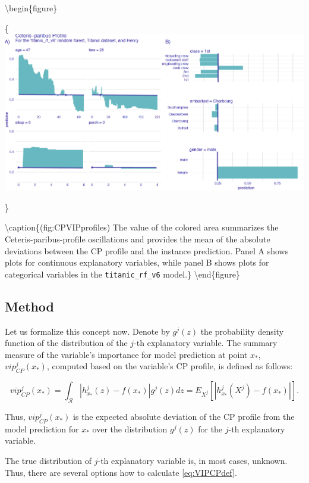 \documentclass[12pt,]{krantz}
\begin{document}
\textbackslash{}begin\{figure\}

\{\centering \includegraphics[width=0.99\linewidth]{figure/profile_v4_rf2}

\}

\textbackslash{}caption\{(fig:CPVIPprofiles) The value of the colored area summarizes the Ceteris-paribus-profile oscillations and provides the mean of the absolute deviations between the CP profile and the instance prediction. Panel A shows plots for continuous explanatory variables, while panel B shows plots for categorical variables in the \texttt{titanic\_rf\_v6} model.\}\label{fig:CPVIPprofiles}
\textbackslash{}end\{figure\}

\hypertarget{CPOscMethod}{%
\subsection{Method}\label{CPOscMethod}}

Let us formalize this concept now. Denote by \(g^j(z)\) the probability density function of the distribution of the \(j\)-th explanatory variable. The summary measure of the variable's importance for model prediction at point \(x_*\), \(vip_{CP}^{j}(x_*)\), computed based on the variable's CP profile, is defined as follows:

\begin{equation}
vip_{CP}^j(x_*) = \int_{\mathcal R} |h^{j}_{x_*}(z) - f(x_*)| g^j(z)dz=E_{X^j}\left[|h^{j}_{x_*}(X^j) - f(x_*)|\right].
\label{eq:VIPCPdef}
\end{equation}

Thus, \(vip_{CP}^j(x_*)\) is the expected absolute deviation of the CP profile from the model prediction for \(x_*\) over the distribution \(g^j(z)\) for the \(j\)-th explanatory variable.

The true distribution of \(j\)-th explanatory variable is, in most cases, unknown. Thus, there are several options how to calculate \eqref{eq:VIPCPdef}.
\end{document}

